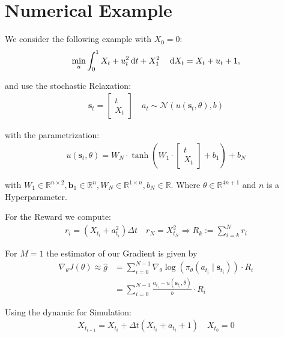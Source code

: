 \documentclass[a4paper,12pt, oneside, twocolumn]{scrartcl}
\newcommand{\dt}{\thinspace \mathrm{d}t}
\newcommand{\dX}{\thinspace \mathrm{d}X}
\begin{document}
\section*{Numerical Example}

We consider the following example with $X_0 = 0$:
%
\begin{align*}
    \min_{u} \int_0^1 X_t +u_t^2  \dt + X_1^2  
    \quad 
    \dX_t = X_t + u_t + 1, 
\end{align*}

and use the stochastic Relaxation:
%
\begin{align*}
    \bm{s}_t =
    \begin{bmatrix}
        t \\
        X_t
    \end{bmatrix}
    \quad
    a_t \sim \mathcal{N}\left(u(\bm{s}_t , \theta), b \right)
\end{align*}

with the parametrization: 
%
\begin{align*}
    u(\bm{s}_t,\theta)
    =
    W_N \cdot 
    \tanh
    \left(
        W_1 \cdot \begin{bmatrix} t \\ X_t \end{bmatrix} + b_1
     \right)
    +
    b_N
\end{align*}

with $W_1 \in \mathbb{R}^{n \times 2}, \bm{b}_1 \in \mathbb{R}^{n}, W_N \in \mathbb{R}^{1 \times n}, b_N \in \mathbb{R}$. 
Where $\theta \in \mathbb{R}^{4n+1}$ and $n$ is a Hyperparameter.

For the Reward we compute:
%
\begin{align*}
    r_i = \left(X_{t_i} + a_{t_i}^2\right) \Delta t \quad r_N = X_{t_N}^2
    \Rightarrow
    R_k :=
    \sum_{i=k}^{N} r_i
\end{align*}

For $M=1$ the estimator of our Gradient is given by 
%
\begin{align*}
    \nabla_{\theta} J(\theta)
    \approx
    \hat{g}
    &=
    \sum_{i=0}^{N-1}
    \nabla_{\theta} \log(\pi_{\theta}(a_{t_i} \mid \bm{s}_{t_i}))
    \cdot
    R_{i}
    \\
    &=
    \sum_{i=0}^{N-1}
    \frac{a_{t_i} - u(\bm{s}_{t_i}, \theta)}{b} 
    \cdot R_i
\end{align*}

Using the dynamic for Simulation:
%
\begin{align*}
    X_{t_{i+1}} = X_{t_i} + \Delta t \left(X_{t_i}+ a_{t_i} +1\right) \quad X_{t_0} = 0
\end{align*}
\end{document}
